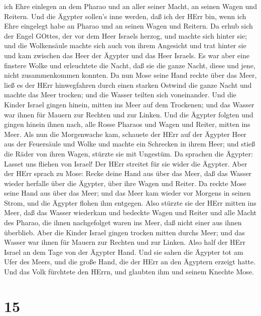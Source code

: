 ich Ehre einlegen an dem Pharao und an aller seiner Macht, an seinen
Wagen und Reitern.  Und die Ägypter sollen's inne werden,
daß ich der HErr bin, wenn ich Ehre eingelegt habe an Pharao und an
seinen Wagen und Reitern.  Da erhub sich der Engel GOttes,
der vor dem Heer Israels herzog, und machte sich hinter sie; und die
Wolkensäule machte sich auch von ihrem Angesicht und trat hinter sie
 und kam zwischen das Heer der Ägypter und das Heer
Israels. Es war aber eine finstere Wolke und erleuchtete die Nacht, daß
sie die ganze Nacht, diese und jene, nicht zusammenkommen konnten.
 Da nun Mose seine Hand reckte über das Meer, ließ es der
HErr hinwegfahren durch einen starken Ostwind die ganze Nacht und machte
das Meer trocken; und die Wasser teilten sich voneinander. 
Und die Kinder Israel gingen hinein, mitten ins Meer auf dem Trockenen;
und das Wasser war ihnen für Mauern zur Rechten und zur Linken.
 Und die Ägypter folgten und gingen hinein ihnen nach, alle
Rosse Pharaos und Wagen und Reiter, mitten ins Meer.  Als
nun die Morgenwache kam, schauete der HErr auf der Ägypter Heer aus der
Feuersäule und Wolke und machte ein Schrecken in ihrem Heer;
 und stieß die Räder von ihren Wagen, stürzte sie mit
Ungestüm. Da sprachen die Ägypter: Lasset uns fliehen von Israel! Der
HErr streitet für sie wider die Ägypter.  Aber der HErr
sprach zu Mose: Recke deine Hand aus über das Meer, daß das Wasser
wieder herfalle über die Ägypter, über ihre Wagen und Reiter.
 Da reckte Mose seine Hand aus über das Meer; und das Meer
kam wieder vor Morgens in seinen Strom, und die Ägypter flohen ihm
entgegen. Also stürzte sie der HErr mitten ins Meer,  daß
das Wasser wiederkam und bedeckte Wagen und Reiter und alle Macht des
Pharao, die ihnen nachgefolget waren ins Meer, daß nicht einer aus ihnen
überblieb.  Aber die Kinder Israel gingen trocken mitten
durchs Meer; und das Wasser war ihnen für Mauern zur Rechten und zur
Linken.  Also half der HErr Israel an dem Tage von der
Ägypter Hand. Und sie sahen die Ägypter tot am Ufer des Meers,
 und die große Hand, die der HErr an den Ägyptern erzeigt
hatte. Und das Volk fürchtete den HErrn, und glaubten ihm und seinem
Knechte Mose.

\hypertarget{section-14}{%
\section{15}\label{section-14}}

